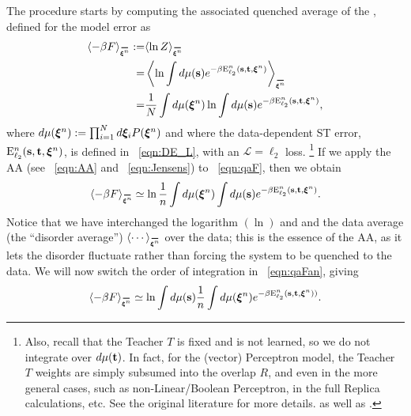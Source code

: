 The procedure starts by computing the associated quenched average of
the \FreeEnergy, defined for the model error as
\begin{align}
\nonumber
\langle-\beta F \rangle_{\AVGNDXI} 
   :=& \langle \ln Z \rangle_{\AVGNDXI} \\ 
\nonumber
   =&\left\langle \ln \int d\mu(\SVEC)e^{-\beta\DETOPSTLL} \right\rangle_{\AVGNDXI}  \\ 
\label{eqn:qaF}
   =& \frac{1}{N}\int d\mu(\NDXI)\ln\int d\mu(\SVEC)e^{-\beta\DETOPSTLL}   ,
\end{align}
where $d\mu(\boldsymbol{\xi}^{n}):=\prod_{i=1}^{N}d\boldsymbol{\xi}_{i} P(\boldsymbol{\xi}^{n})$ and
where the data-dependent ST error, $\mathbf{\mathrm{E}}^{n}_{\ell_2}({\mathbf{s}},{\mathbf{t}}, \boldsymbol{\xi}^{n})$, is defined in \EQN~\ref{eqn:DE_L},
with an $\mathcal{L}=\ell_2$ loss.  \footnote{Also, recall that the Teacher $T$ is fixed and is not learned, so we do not integrate over $d\mu({\mathbf{t}})$. In fact, for the (vector) Perceptron model, the Teacher $T$ weights are simply subsumed into the overlap $R$, and even in the more general cases, such as non-Linear/Boolean Perceptron, in the full Replica calculations, etc.  See the original literature for more details. \cite{Opper01,SST92,EngelAndVanDenBroeck} as well as \cite{MM17_TR}.}
%
If we apply the AA (see \EQN~\ref{eqn:AA} and \EQN~\ref{eqn:Jensens}) to \EQN~\ref{eqn:qaF}, then we obtain
\begin{align}
\label{eqn:qaFan}
\langle-\beta F \rangle_{\AVGNDXI} \simeq 
   \ln \frac{1}{\ND}\int d\mu(\NDXI) \int d\mu(\SVEC) e^{-\beta\DETOPSTLL}   .
\end{align}
%
Notice that we have interchanged the logarithm $(\ln)$ and
and the data average (the “disorder average”) 
$\langle\cdots\rangle_{\AVGNDXI}$ over the data; 
this is the essence of the AA, as it lets the disorder fluctuate rather than forcing the system to be quenched to the data.
%
We will now switch the order of integration in \EQN~\ref{eqn:qaFan}, giving
\begin{align}
\label{eqn:qaFan3}
\langle-\beta F \rangle_{\AVGNDXI} \simeq 
   \ln \int d\mu(\SVEC)\frac{1}{\ND}\int d\mu(\NDXI)e^{-\beta\DETOPSTLL)}   .
\end{align}



